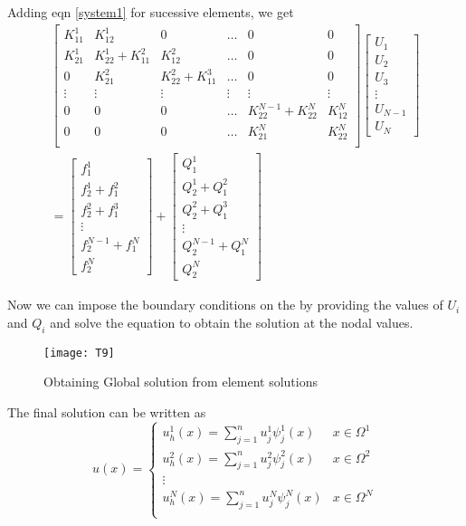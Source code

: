 Adding eqn \ref{system1} for sucessive elements, we get
\begin{eqnarray*}
\begin{bmatrix}
		K_{11}^1 & K_{12}^1 & 0 & \dots & 0 & 0 \\
		K_{21}^1 & K_{22}^1 + K_{11}^2 & K_{12}^2 & \dots & 0 & 0 \\
		0 & K_{21}^2 & K_{22}^2 + K_{11}^3 & \dots& 0 & 0 \\
		\vdots & \vdots & \vdots & \vdots & \vdots & \vdots \\
		0 &0 & 0 & \dots & K_{22}^{N-1} + K_{22}^N & K_{12}^N \\
		0 & 0 & 0 & \dots & K_{21}^N & K_{22}^N \\
\end{bmatrix}
\begin{bmatrix}
	U_1 \\
	U_2 \\
	U_3 \\
	\vdots \\
	U_{N-1} \\
	U_N
\end{bmatrix}\\=
\begin{bmatrix}
	f_1^1 \\
	f_2^1 + f_1^2\\
	f_2^2 + f_1^3\\
	\vdots \\
	f_2^{N-1} + f_1^N \\
	f_2^N
\end{bmatrix} +
\begin{bmatrix}
	Q_1^1 \\
	Q_2^1 + Q_1^2\\
	Q_2^2 + Q_1^3\\
	\vdots \\
	Q_2^{N-1} + Q_1^N \\
	Q_2^N
\end{bmatrix} 
\end{eqnarray*}

Now we can impose the boundary conditions on the by providing the values of $U_i$ and $Q_i$ and solve the equation to obtain the solution at the nodal values.
    \begin{figure}[h!]
	\centering
	\texttt{[image: T9]}
	\caption{Obtaining Global solution from element solutions}
\end{figure}
The final solution can be written as
\[ u(x) = \begin{cases} 
	u_h^1(x) = \sum_{j=1}^{n} u_j^1 \psi_j^1(x)& x \in \Omega^1 \\
	u_h^2(x) = \sum_{j=1}^{n} u_j^2 \psi_j^2(x)& x \in \Omega^2 \\
	\vdots\\
	u_h^N(x) = \sum_{j=1}^{n} u_j^N \psi_j^N(x)& x \in \Omega^N \\
\end{cases}
\]



